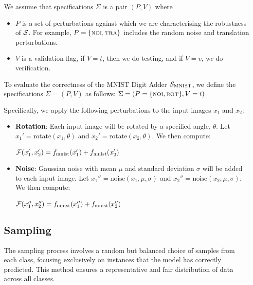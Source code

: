 \documentclass[10pt, conference, a4paper, final]{IEEEtran}
\begin{document}
We assume that specifications $\Sigma$ is a pair $(P, V)$ where
\begin{itemize}
\item $P$ is a set of perturbations against which we are characterising the robustness of $\S$. For example, $P = \{\noise,\translation\}$ includes the random noise and translation perturbations.

\item $V$ is a validation flag, if $V=t$, then we do testing, and if $V=v$, we do verification.
\end{itemize}


\begin{example}
    To evaluate the correctness of the MNIST Digit Adder $\S_{\text{MNIST}}$, we define the specifications $\Sigma = (P, V)$ as follows:
    $\Sigma = (P = \{\noise,\rotation\},  V=t)$
  
    Specifically, we apply the following perturbations to the input images $x_1$ and $x_2$:
    \begin{itemize} 
        \item \textbf{Rotation}: Each input image will be rotated by a specified angle, $\theta$. Let $x_1' = \text{rotate}(x_1, \theta)$ and $x_2' = \text{rotate}(x_2, \theta)$. We then compute:
       
        $\F(x_1', x_2') = f_{\text{mnist}}(x_1') + f_{\text{mnist}}(x_2')$
        \item \textbf{Noise}: Gaussian noise with mean $\mu$ and standard deviation $\sigma$ will be added to each input image. Let $x_1'' = \text{noise}(x_1, \mu, \sigma)$ and $x_2'' = \text{noise}(x_2, \mu, \sigma)$. We then compute:
        
        $\F(x_1'', x_2'') = f_{\text{mnist}}(x_1'') + f_{\text{mnist}}(x_2'')$
    \end{itemize}
  
  \end{example}
  

\subsection{Sampling}
The sampling process involves a random but balanced choice of samples from each class, focusing exclusively on instances that the model has correctly predicted. This method ensures a representative and fair distribution of data across all classes. 
\end{document}
